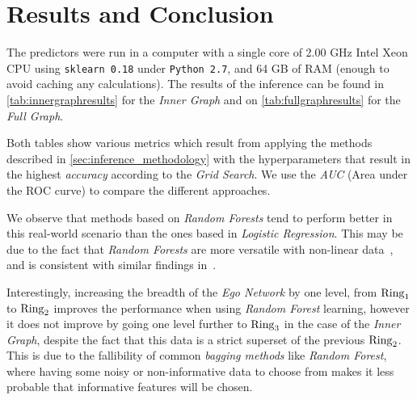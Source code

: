 
\section{Results and Conclusion}
\label{sec:results}





The predictors were run in a computer with a single core of 2.00 GHz Intel Xeon CPU using \texttt{sklearn 0.18} under \texttt{Python 2.7}, and 64 GB of RAM (enough to avoid caching any calculations). The results of the inference can be found in \cref{tab:innergraphresults} for the \emph{Inner Graph} and on \cref{tab:fullgraphresults} for the \emph{Full Graph}.


Both tables show various metrics which result from applying the methods described in \cref{sec:inference_methodology} with the hyperparameters that result in the highest \emph{accuracy} according to the \emph{Grid Search}.
We use the \emph{AUC} (Area under the ROC curve) to compare the different approaches.

We observe that methods based on \emph{Random Forests} tend to perform better in this real-world scenario than the ones based in \emph{Logistic Regression}.
This may be due to the fact that \emph{Random Forests} are more versatile with non-linear data~\cite{logisticvsdecision}, and is consistent with similar findings in~\cite{muchlinski2016}.

Interestingly, increasing the breadth of the \emph{Ego Network} by one level, from $\operatorname{Ring}_1$ to $\operatorname{Ring}_2$ improves the performance when using \emph{Random Forest} learning, however it does not improve by going one level further to $\operatorname{Ring}_3$ in the case of the \emph{Inner Graph}, despite the fact that this data is a strict superset of the previous $\operatorname{Ring}_2$. This is due to the fallibility of common \emph{bagging methods} like \emph{Random Forest}, where having some noisy or non-informative data to choose from makes it less probable that informative features will be chosen.

